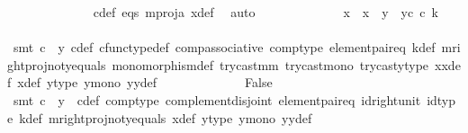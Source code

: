 \begin{isabellebody}
\ \ \ \ \ \ \ \ \ \ \ \ \isamarkupfalse%
\ c{\isacharunderscore}{\kern0pt}def\ eqs\ m{\isacharunderscore}{\kern0pt}proj{\isacharunderscore}{\kern0pt}a\ x{\isacharunderscore}{\kern0pt}def\ \isamarkupfalse%
\ auto\isanewline
\ \ \ \ \ \ \ \ \ \ \isamarkupfalse%
\ \isamarkupfalse%
\ {\isachardoublequoteopen}{\isacharparenleft}{\kern0pt}x\ {\isacharequal}{\kern0pt}\ x{}{\isacharparenright}{\kern0pt}\ {\isasymand}\ {\isacharparenleft}{\kern0pt}y{}\ {\isacharequal}{\kern0pt}\ y{}\isactrlsup c\ {\isasymcirc}\isactrlsub c\ k{\isacharparenright}{\kern0pt}{\isachardoublequoteclose}\isanewline
\ \ \ \ \ \ \ \ \ \ \ \ \isamarkupfalse%
\ {\isacharparenleft}{\kern0pt}smt\ {\isacartoucheopen}c\ {\isasymnoteq}\ y{}{\isacartoucheclose}\ c{\isacharunderscore}{\kern0pt}def\ cfunc{\isacharunderscore}{\kern0pt}type{\isacharunderscore}{\kern0pt}def\ comp{\isacharunderscore}{\kern0pt}associative\ comp{\isacharunderscore}{\kern0pt}type\ element{\isacharunderscore}{\kern0pt}pair{\isacharunderscore}{\kern0pt}eq\ k{\isacharunderscore}{\kern0pt}def\ m{\isacharunderscore}{\kern0pt}rightproj{\isacharunderscore}{\kern0pt}not{\isacharunderscore}{\kern0pt}y{}{\isacharunderscore}{\kern0pt}equals\ monomorphism{\isacharunderscore}{\kern0pt}def{}\ try{\isacharunderscore}{\kern0pt}cast{\isacharunderscore}{\kern0pt}m{\isacharunderscore}{\kern0pt}m{\isacharprime}{\kern0pt}\ try{\isacharunderscore}{\kern0pt}cast{\isacharunderscore}{\kern0pt}mono\ trycast{\isacharunderscore}{\kern0pt}y{}{\isacharunderscore}{\kern0pt}type\ x{}x{}{\isacharunderscore}{\kern0pt}def{\isacharparenleft}{\kern0pt}{}{\isacharparenright}{\kern0pt}\ x{\isacharunderscore}{\kern0pt}def\ y{}{\isacharprime}{\kern0pt}{\isacharunderscore}{\kern0pt}type\ y{}{\isacharunderscore}{\kern0pt}mono\ y{}y{}{\isacharunderscore}{\kern0pt}def{\isacharparenleft}{\kern0pt}{}{\isacharparenright}{\kern0pt}{\isacharparenright}{\kern0pt}\isanewline
\ \ \ \ \ \ \ \ \ \ \isamarkupfalse%
\ \isamarkupfalse%
\ False\isanewline
\ \ \ \ \ \ \ \ \ \ \ \ \isamarkupfalse%
\ {\isacharparenleft}{\kern0pt}smt\ {\isacartoucheopen}c\ {\isasymnoteq}\ y{}{\isacartoucheclose}\ \ c{\isacharunderscore}{\kern0pt}def\ comp{\isacharunderscore}{\kern0pt}type\ complement{\isacharunderscore}{\kern0pt}disjoint\ element{\isacharunderscore}{\kern0pt}pair{\isacharunderscore}{\kern0pt}eq\ id{\isacharunderscore}{\kern0pt}right{\isacharunderscore}{\kern0pt}unit{}\ id{\isacharunderscore}{\kern0pt}type\ k{\isacharunderscore}{\kern0pt}def\ m{\isacharunderscore}{\kern0pt}rightproj{\isacharunderscore}{\kern0pt}not{\isacharunderscore}{\kern0pt}y{}{\isacharunderscore}{\kern0pt}equals\ x{\isacharunderscore}{\kern0pt}def\ y{}{\isacharprime}{\kern0pt}{\isacharunderscore}{\kern0pt}type\ y{}{\isacharunderscore}{\kern0pt}mono\ y{}y{}{\isacharunderscore}{\kern0pt}def{\isacharparenleft}{\kern0pt}{}{\isacharparenright}{\kern0pt}{\isacharparenright}{\kern0pt}\isanewline

\end{isabellebody}
